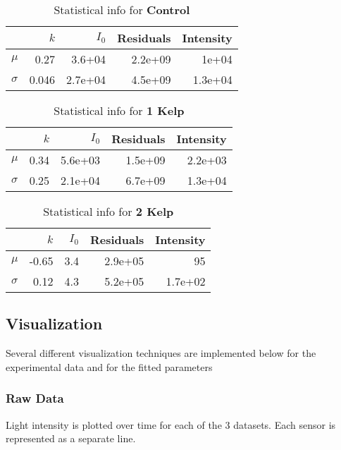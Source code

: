 \begin{table}[H]
	\centering
	\begin{tabular}{lrrrr}
		\toprule
		&  $k$ & $I_0$ & Residuals & Intensity\\
		\midrule
		$\mu$ & 0.27 & 3.6+04 & 2.2e+09 & 1e+04 \\
		$\sigma$ & 0.046 & 2.7e+04 & 4.5e+09 & 1.3e+04 \\
	\end{tabular}
	\caption{Statistical info for \textbf{Control}}
	\label{stats_control}
\end{table}

\begin{table}[H]
	\centering
	\begin{tabular}{lrrrr}
		\toprule
		&  $k$ & $I_0$ & Residuals & Intensity\\
		\midrule
		$\mu$ & 0.34 & 5.6e+03 & 1.5e+09 & 2.2e+03 \\
		$\sigma$ & 0.25 & 2.1e+04 & 6.7e+09 & 1.3e+04 \\
	\end{tabular}
	\caption{Statistical info for \textbf{1 Kelp}}
	\label{stats_1_kelp}
\end{table}

\begin{table}[H]
	\centering
	\begin{tabular}{lrrrr}
		\toprule
		&  $k$ & $I_0$ & Residuals & Intensity\\
		\midrule
		$\mu$ & -0.65 & 3.4 & 2.9e+05 & 95 \\
		$\sigma$ & 0.12 & 4.3 & 5.2e+05 & 1.7e+02 \\
	\end{tabular}
	\caption{Statistical info for \textbf{2 Kelp}}
	\label{stats_2_kelp}
\end{table}
	
\pagebreak
\subsection{Visualization}
Several different visualization techniques are implemented below for the experimental data and for the fitted parameters

\subsubsection{Raw Data}

Light intensity is plotted over time for each of the 3 datasets. Each sensor is represented as a separate line.

